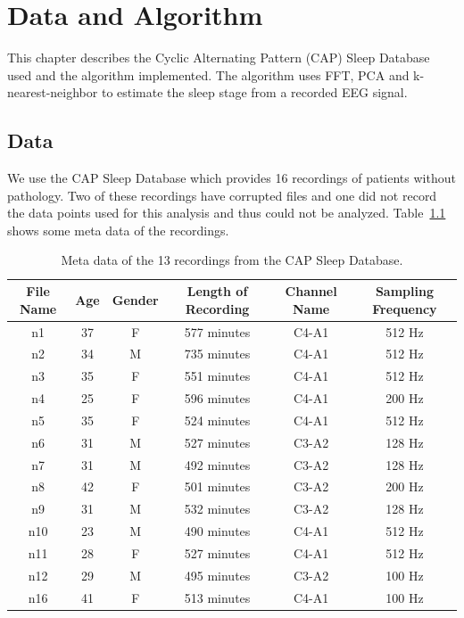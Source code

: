 \chapter{Data and Algorithm}
\label{chapter:data_and_algorithm}

This chapter describes the Cyclic Alternating Pattern (CAP) Sleep Database used and the algorithm implemented. The algorithm uses FFT, PCA and k-nearest-neighbor to estimate the sleep stage from a recorded EEG signal.

\section{Data}
\label{sec:data}

We use the CAP Sleep Database\cite{Terzano2001}\cite{Goldberger2000} which provides 16 recordings of patients without pathology. Two of these recordings have corrupted files and one did not record the data points used for this analysis and thus could not be analyzed. Table~\ref{tab:meta_data_of_recordings} shows some meta data of the recordings.

\begin{table}
	\centering
	\begin{tabular}{c|c|c|c|c|c}
		File Name & Age & Gender & Length of Recording & Channel Name & Sampling Frequency \\
		\hline
		n1  & 37 & F & 577 minutes & C4-A1  & 512 Hz \\
		n2  & 34 & M & 735 minutes & C4-A1  & 512 Hz \\
		n3  & 35 & F & 551 minutes & C4-A1  & 512 Hz \\
		n4  & 25 & F & 596 minutes & C4-A1  & 200 Hz \\
		n5  & 35 & F & 524 minutes & C4-A1  & 512 Hz \\
		n6  & 31 & M & 527 minutes & C3-A2  & 128 Hz \\
		n7  & 31 & M & 492 minutes & C3-A2  & 128 Hz \\
		n8  & 42 & F & 501 minutes & C3-A2  & 200 Hz \\
		n9  & 31 & M & 532 minutes & C3-A2  & 128 Hz \\
		n10 & 23 & M & 490 minutes & C4-A1  & 512 Hz \\
		n11 & 28 & F & 527 minutes & C4-A1  & 512 Hz \\
		n12 & 29 & M & 495 minutes & C3-A2  & 100 Hz \\
		n16 & 41 & F & 513 minutes & C4-A1  & 100 Hz \\
	\end{tabular}
	\caption{Meta data of the 13 recordings from the CAP Sleep Database.}
	\label{tab:meta_data_of_recordings}
\end{table}

